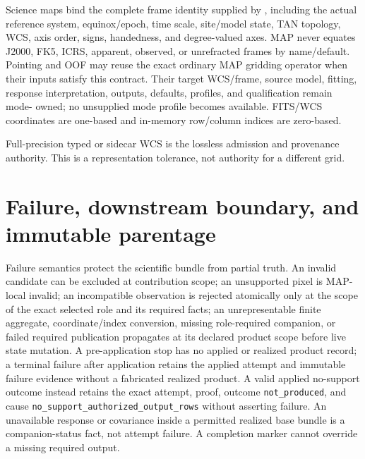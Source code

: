 \documentclass[10pt]{article}
\begin{document}
Science maps bind the complete frame identity supplied by
\SCIMapASTRTCGridProfile, including the actual reference
system, equinox/epoch, time scale, site/model state, TAN topology, WCS, axis
order, signs, handedness, and degree-valued axes. MAP never equates J2000,
FK5, ICRS, apparent, observed, or unrefracted frames by name/default. Pointing
and OOF may reuse the exact ordinary MAP gridding operator when their inputs
satisfy this contract. Their target WCS/frame, source model, fitting, response
interpretation, outputs, defaults, profiles, and qualification remain mode-
owned; no unsupplied mode profile becomes available. FITS/WCS coordinates are
one-based and in-memory row/column indices are zero-based.

Full-precision typed or sidecar WCS is the lossless admission and provenance
authority. \SCIMapWCSComparisonDefinition{} This is a representation tolerance,
not authority for a different grid.

\SCIMapLifecycleDefinition

\SCIMapLifecycleTable

\SCIMapAxisSeparationDefinition

\SCIMapLifecycleAssumption

\clearpage
\section{Failure, downstream boundary, and immutable parentage}

Failure semantics protect the scientific bundle from partial truth. An
invalid candidate can be excluded at contribution scope; an unsupported pixel
is MAP-local invalid; an incompatible observation is rejected atomically only
at the scope of the exact selected role and its required facts; an
unrepresentable finite aggregate, coordinate/index conversion, missing
role-required companion, or failed required publication propagates at its
declared product scope before live state mutation. A pre-application stop has
no applied or realized product record; a terminal failure after application
retains the applied attempt and immutable failure evidence without a fabricated
realized product. A valid applied no-support outcome instead retains the exact
attempt, proof, outcome \texttt{not\_produced}, and cause
\texttt{no\_support\_authorized\_output\_rows} without asserting failure.
An unavailable response or covariance inside a permitted realized base bundle
is a companion-status fact, not attempt failure. A completion marker
cannot override a missing required output.
\end{document}
